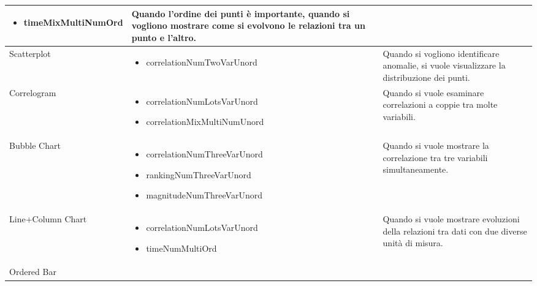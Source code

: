 \begin{xltabular}{\columnwidth}{|p{0.15\columnwidth}|X|p{0.27\columnwidth}|}
\begin{itemize}[noitemsep,topsep=0pt, left=0pt]
        \item timeMixMultiNumOrd
    \end{itemize} & 
    Quando l'ordine dei punti è importante, quando si vogliono mostrare come si evolvono le relazioni tra un punto e l'altro. \\
    \hline
    Scatterplot & 
    \vspace{-3.5mm}
    \begin{itemize}[noitemsep,topsep=0pt, left=0pt]
        \item correlationNumTwoVarUnord
    \end{itemize} & 
    Quando si vogliono identificare anomalie, si vuole visualizzare la distribuzione dei punti. \\
    \hline
    Correlogram & 
    \vspace{-3.5mm}
    \begin{itemize}[noitemsep,topsep=0pt, left=0pt]
        \item correlationNumLotsVarUnord
        \item correlationMixMultiNumUnord
    \end{itemize} & 
    Quando si vuole esaminare correlazioni a coppie tra molte variabili. \\
    \hline
    Bubble Chart & 
    \vspace{-3.5mm}
    \begin{itemize}[noitemsep,topsep=0pt, left=0pt]
        \item correlationNumThreeVarUnord
        \item rankingNumThreeVarUnord
        \item magnitudeNumThreeVarUnord
    \end{itemize} & 
    Quando si vuole mostrare la correlazione tra tre variabili simultaneamente. \\
    \hline
    Line+Column Chart & 
    \vspace{-3.5mm}
    \begin{itemize}[noitemsep,topsep=0pt, left=0pt]
        \item correlationNumLotsVarUnord
        \item timeNumMultiOrd
    \end{itemize} & 
    Quando si vuole mostrare evoluzioni della relazioni tra dati con due diverse unità di misura. \\
    \hline
    Ordered Bar & 
    \vspace{-3.5mm}
    \begin{itemize}[noitemsep,topsep=0pt, left=0pt]

\end{itemize}
\end{xltabular}
